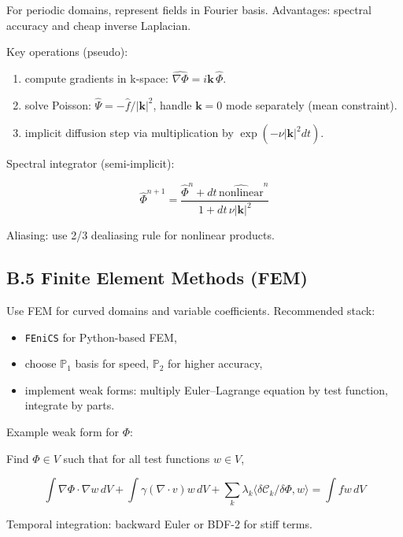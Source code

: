 \documentclass[11pt,a4paper]{article}
\begin{document}
For periodic domains, represent fields in Fourier basis. Advantages: spectral accuracy and cheap inverse Laplacian.

Key operations (pseudo):

\begin{enumerate}
  \item compute gradients in k-space: \(\widehat{\nabla \Phi} = i \mathbf{k} \, \widehat{\Phi}\).
  \item solve Poisson: \(\widehat{\Psi} = -\widehat{f} / |\mathbf{k}|^2\), handle \(\mathbf{k}=0\) mode separately (mean constraint).
  \item implicit diffusion step via multiplication by \(\exp(-\nu |\mathbf{k}|^2 dt)\).
\end{enumerate}

Spectral integrator (semi-implicit):

\[
\widehat{\Phi}^{n+1} = \frac{\widehat{\Phi}^n + dt \, \widehat{\text{nonlinear}}^n}{1 + dt\, \nu |\mathbf{k}|^2}
\]

Aliasing: use 2/3 dealiasing rule for nonlinear products.

\subsection{B.5 Finite Element Methods (FEM)}

Use FEM for curved domains and variable coefficients. Recommended stack:

\begin{itemize}
  \item \texttt{FEniCS} for Python-based FEM,
  \item choose \(\mathbb{P}_1\) basis for speed, \(\mathbb{P}_2\) for higher accuracy,
  \item implement weak forms: multiply Euler–Lagrange equation by test function, integrate by parts.
\end{itemize}

Example weak form for \(\Phi\):

Find \(\Phi\in V\) such that for all test functions \(w\in V\),

\[
\int \nabla \Phi \cdot \nabla w \, dV + \int \gamma (\nabla\cdot v) w \, dV + \sum_k \lambda_k \langle \delta \mathcal{C}_k/\delta \Phi, w \rangle = \int f w \, dV
\]

Temporal integration: backward Euler or BDF-2 for stiff terms.
\end{document}
